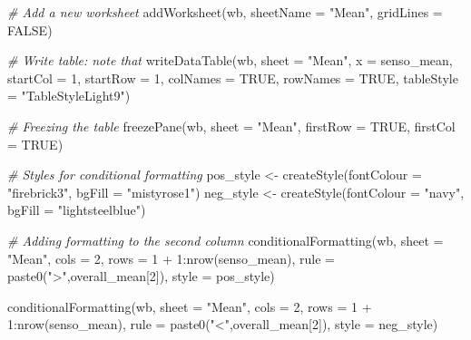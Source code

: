 \documentclass[
]{book}
\newenvironment{Shaded}{\begin{snugshade}}{\end{snugshade}}
\newcommand{\AttributeTok}[1]{\textcolor[rgb]{0.77,0.63,0.00}{#1}}
\newcommand{\CommentTok}[1]{\textcolor[rgb]{0.56,0.35,0.01}{\textit{#1}}}
\newcommand{\ConstantTok}[1]{\textcolor[rgb]{0.00,0.00,0.00}{#1}}
\newcommand{\DecValTok}[1]{\textcolor[rgb]{0.00,0.00,0.81}{#1}}
\newcommand{\FunctionTok}[1]{\textcolor[rgb]{0.00,0.00,0.00}{#1}}
\newcommand{\NormalTok}[1]{#1}
\newcommand{\OtherTok}[1]{\textcolor[rgb]{0.56,0.35,0.01}{#1}}
\newcommand{\SpecialCharTok}[1]{\textcolor[rgb]{0.00,0.00,0.00}{#1}}
\newcommand{\StringTok}[1]{\textcolor[rgb]{0.31,0.60,0.02}{#1}}
\begin{document}
\begin{Shaded}
\begin{Highlighting}[]
\CommentTok{\# Add a new worksheet}
\FunctionTok{addWorksheet}\NormalTok{(wb, }\AttributeTok{sheetName =} \StringTok{"Mean"}\NormalTok{, }\AttributeTok{gridLines =} \ConstantTok{FALSE}\NormalTok{)}

\CommentTok{\# Write table: note that }
\FunctionTok{writeDataTable}\NormalTok{(wb,}
               \AttributeTok{sheet =} \StringTok{"Mean"}\NormalTok{,}
               \AttributeTok{x =}\NormalTok{ senso\_mean, }
               \AttributeTok{startCol =} \DecValTok{1}\NormalTok{,}
               \AttributeTok{startRow =} \DecValTok{1}\NormalTok{,}
               \AttributeTok{colNames =} \ConstantTok{TRUE}\NormalTok{, }\AttributeTok{rowNames =} \ConstantTok{TRUE}\NormalTok{, }
               \AttributeTok{tableStyle =} \StringTok{"TableStyleLight9"}\NormalTok{)}

\CommentTok{\# Freezing the table}
\FunctionTok{freezePane}\NormalTok{(wb, }\AttributeTok{sheet =} \StringTok{"Mean"}\NormalTok{, }\AttributeTok{firstRow =} \ConstantTok{TRUE}\NormalTok{, }\AttributeTok{firstCol =} \ConstantTok{TRUE}\NormalTok{)}

\CommentTok{\# Styles for conditional formatting}
\NormalTok{pos\_style }\OtherTok{\textless{}{-}} \FunctionTok{createStyle}\NormalTok{(}\AttributeTok{fontColour =} \StringTok{"firebrick3"}\NormalTok{, }\AttributeTok{bgFill =} \StringTok{"mistyrose1"}\NormalTok{)}
\NormalTok{neg\_style }\OtherTok{\textless{}{-}} \FunctionTok{createStyle}\NormalTok{(}\AttributeTok{fontColour =} \StringTok{"navy"}\NormalTok{, }\AttributeTok{bgFill =} \StringTok{"lightsteelblue"}\NormalTok{)}

\CommentTok{\# Adding formatting to the second column}
\FunctionTok{conditionalFormatting}\NormalTok{(wb,}
                      \AttributeTok{sheet =} \StringTok{"Mean"}\NormalTok{, }
                      \AttributeTok{cols  =} \DecValTok{2}\NormalTok{,}
                      \AttributeTok{rows  =} \DecValTok{1} \SpecialCharTok{+} \DecValTok{1}\SpecialCharTok{:}\FunctionTok{nrow}\NormalTok{(senso\_mean), }
                      \AttributeTok{rule  =} \FunctionTok{paste0}\NormalTok{(}\StringTok{"\textgreater{}"}\NormalTok{,overall\_mean[}\DecValTok{2}\NormalTok{]),}
                      \AttributeTok{style =}\NormalTok{ pos\_style)}

\FunctionTok{conditionalFormatting}\NormalTok{(wb,}
                      \AttributeTok{sheet =} \StringTok{"Mean"}\NormalTok{,}
                      \AttributeTok{cols  =} \DecValTok{2}\NormalTok{,}
                      \AttributeTok{rows  =} \DecValTok{1} \SpecialCharTok{+} \DecValTok{1}\SpecialCharTok{:}\FunctionTok{nrow}\NormalTok{(senso\_mean), }
                      \AttributeTok{rule  =} \FunctionTok{paste0}\NormalTok{(}\StringTok{"\textless{}"}\NormalTok{,overall\_mean[}\DecValTok{2}\NormalTok{]),}
                      \AttributeTok{style =}\NormalTok{ neg\_style)}


\end{Highlighting}
\end{Shaded}
\end{document}

